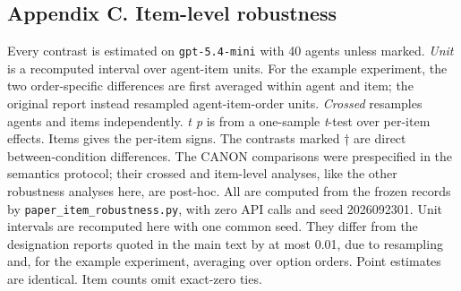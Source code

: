 \documentclass[
  11pt]{article}
\begin{document}
\subsection{Appendix C. Item-level
robustness}\label{appendix-c.-item-level-robustness}

Every contrast is estimated on \texttt{gpt-5.4-mini} with 40 agents
unless marked. \emph{Unit} is a recomputed interval over agent-item
units. For the example experiment, the two order-specific differences
are first averaged within agent and item; the original report instead
resampled agent-item-order units. \emph{Crossed} resamples agents and
items independently. \emph{t p} is from a one-sample \emph{t}-test over
per-item effects. Items gives the per-item signs. The contrasts marked †
are direct between-condition differences. The CANON comparisons were
prespecified in the semantics protocol; their crossed and item-level
analyses, like the other robustness analyses here, are post-hoc. All are
computed from the frozen records by \texttt{paper\_item\_robustness.py},
with zero API calls and seed 2026092301. Unit intervals are recomputed
here with one common seed. They differ from the designation reports
quoted in the main text by at most 0.01, due to resampling and, for the
example experiment, averaging over option orders. Point estimates are
identical. Item counts omit exact-zero ties.
\end{document}
